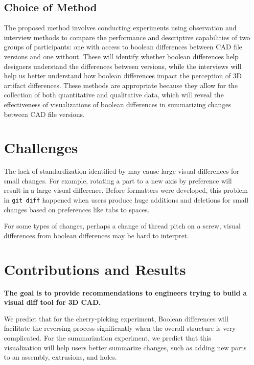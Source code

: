 \documentclass[sigconf,authorversion,nonacm]{acmart}
\begin{document}
\subsection{Choice of Method}
The proposed method involves conducting experiments using observation and interview methods to compare the performance and descriptive capabilities of two groups of participants: one with access to boolean differences between CAD file versions and one without. These will identify whether boolean differences help designers understand the differences between versions, while the interviews will help us better understand how boolean differences impact the perception of 3D artifact differences. These methods are appropriate because they allow for the collection of both quantitative and qualitative data, which will reveal the effectiveness of visualizations of boolean differences in summarizing changes between CAD file versions.

\section{Challenges}

The lack of standardization identified by \citet{cheng2023age} may cause large visual differences for small changes.
For example, rotating a part to a new axis by preference will result in a large visual difference.
Before formatters were developed, this problem in \texttt{git diff} happened when users produce huge additions and deletions for small changes based on preferences like tabs to spaces.

For some types of changes, perhaps a change of thread pitch on a screw, visual differences from boolean differences may be hard to interpret.

\section{Contributions and Results}

\textbf{The goal is to provide recommendations to engineers trying to build a visual diff tool for 3D CAD.}

We predict that for the cherry-picking experiment, Boolean differences will facilitate the reversing process significantly when the overall structure is very complicated. For the summarization experiment, we predict that this visualization will help users better summarize changes, such as adding new parts to an assembly, extrusions, and holes.%
\end{document}
